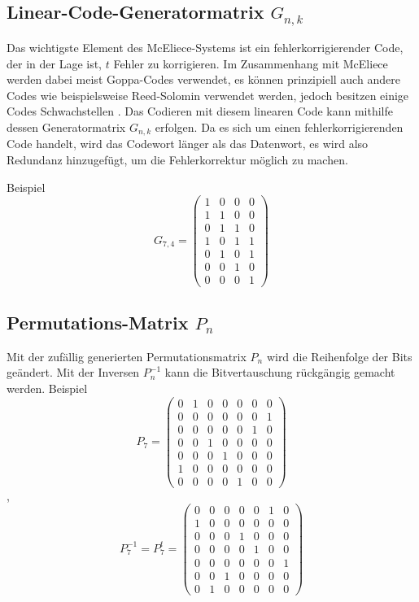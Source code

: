 \subsection{Linear-Code-Generatormatrix $G_{n,k}$
\label{mceliece:subsection:g_nk}}
Das wichtigste Element des McEliece-Systems ist ein fehlerkorrigierender Code,
der in der Lage ist, $t$ Fehler zu korrigieren.
Im Zusammenhang mit McEliece werden dabei meist Goppa-Codes verwendet,
es können prinzipiell auch andere Codes wie beispielsweise Reed-Solomin verwendet werden,
jedoch besitzen einige Codes Schwachstellen \cite{mceliece:lorenz}.
Das Codieren mit diesem linearen Code kann mithilfe dessen Generatormatrix $G_{n,k}$ erfolgen.
Da es sich um einen fehlerkorrigierenden Code handelt,
wird das Codewort länger als das Datenwort,
es wird also Redundanz hinzugefügt,
um die Fehlerkorrektur möglich zu machen.

Beispiel
\[
    G_{7,4}=
    \begin{pmatrix}
        1 & 0 & 0 & 0\\
        1 & 1 & 0 & 0\\
        0 & 1 & 1 & 0\\
        1 & 0 & 1 & 1\\
        0 & 1 & 0 & 1\\
        0 & 0 & 1 & 0\\
        0 & 0 & 0 & 1
    \end{pmatrix}
\]

\subsection{Permutations-Matrix $P_n$
\label{mceliece:subsection:p_n}}
Mit der zufällig generierten Permutationsmatrix $P_n$ wird die Reihenfolge der Bits geändert.
Mit der Inversen $P_n^{-1}$ kann die Bitvertauschung rückgängig gemacht werden.
Beispiel
\[
    P_7=
    \begin{pmatrix}
        0 & 1 & 0 & 0 & 0 & 0 & 0\\
        0 & 0 & 0 & 0 & 0 & 0 & 1\\
        0 & 0 & 0 & 0 & 0 & 1 & 0\\
        0 & 0 & 1 & 0 & 0 & 0 & 0\\
        0 & 0 & 0 & 1 & 0 & 0 & 0\\
        1 & 0 & 0 & 0 & 0 & 0 & 0\\
        0 & 0 & 0 & 0 & 1 & 0 & 0
    \end{pmatrix}
\]
,
\[
    P_7^{-1}=P_7^t=
    \begin{pmatrix}
        0 & 0 & 0 & 0 & 0 & 1 & 0\\
        1 & 0 & 0 & 0 & 0 & 0 & 0\\
        0 & 0 & 0 & 1 & 0 & 0 & 0\\
        0 & 0 & 0 & 0 & 1 & 0 & 0\\
        0 & 0 & 0 & 0 & 0 & 0 & 1\\
        0 & 0 & 1 & 0 & 0 & 0 & 0\\
        0 & 1 & 0 & 0 & 0 & 0 & 0
    \end{pmatrix}
\]

